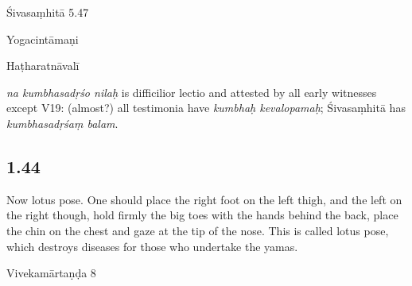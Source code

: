 \begin{ekdosis}
\begin{sources}[hp01_043]
Śivasaṃhitā 5.47

\begin{versinnote}
\end{versinnote}

\end{sources}

\begin{testimonia}[hp01_043]
Yogacintāmaṇi

\begin{versinnote}
\end{versinnote}

Haṭharatnāvalī

\begin{versinnote}
\end{versinnote}

\end{testimonia}

\begin{philcomm}[hp01_043]
\emph{na kumbhasadṛśo nilaḥ} is difficilior lectio and attested by all early witnesses except V19: (almost?) all testimonia have \emph{kumbhaḥ kevalopamaḥ}; Śivasaṃhitā has \emph{kumbhasadṛśaṃ balam}.
\end{philcomm}

\subsection*{1.44}
\begin{translation}[hp01_044]
Now lotus pose.
One should place the right foot on the left thigh, and the left on the right though, hold firmly the big toes with the hands behind the back, place the chin on the chest and gaze at the tip of the nose. This is called lotus pose, which destroys diseases for those who undertake the yamas.
\end{translation}

\begin{sources}[hp01_044]
Vivekamārtaṇḍa 8


\end{sources}
\end{ekdosis}
